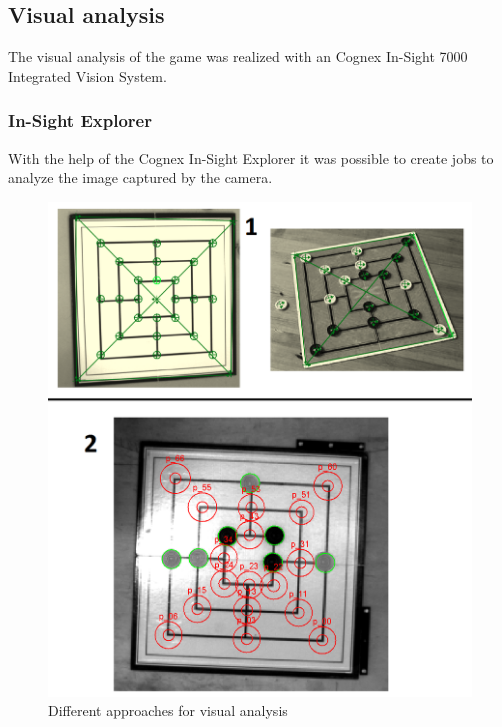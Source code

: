 \documentclass[a4paper]{spie}  %
\begin{document}
\begin{large}
\subsection{Visual analysis}
\label{visual_analysis}
The visual analysis of the game was realized with an Cognex In-Sight 7000 Integrated Vision System. 
\subsubsection{In-Sight Explorer}
With the help of the Cognex In-Sight Explorer it was possible to create jobs to analyze the image captured by the camera.\\
\begin{figure}[h]
\includegraphics[width=15cm]{images/camera_00.png}
\centering
\caption{Different approaches for visual analysis}
\label{camera_00}
\end{figure}

\end{large}
\end{document}
